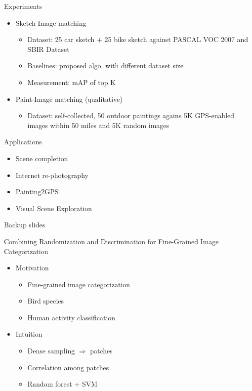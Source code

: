 \documentclass[12pt]{beamer}
\begin{document}
\begin{frame}{Experiments}
	\begin{itemize}
		\item Sketch-Image matching
		\begin{itemize}
			\item Dataset: 25 car sketch + 25 bike sketch against PASCAL VOC 2007 and SBIR Dataset
			\item Baselines: proposed algo. with different dataset size
			\item Measurement: mAP of top K
		\end{itemize}
		\item Paint-Image matching (qualitative)
		\begin{itemize}
			\item Dataset: self-collected, 50 outdoor paintings agains 5K GPS-enabled images within 50 miles and 5K random images
		\end{itemize}
	\end{itemize}
\end{frame}

\begin{frame}{Applications}
	\begin{itemize}
		\item Scene completion
		\item Internet re-photography
		\item Painting2GPS
		\item Visual Scene Exploration
	\end{itemize}
\end{frame}

\begin{frame}{Backup slides}
\end{frame}

\begin{frame}{Combining Randomization and Discrimination for Fine-Grained Image Categorization}
    \begin{itemize}
        \item Motivation
        \begin{itemize}
            \item Fine-grained image categorization
            \item Bird species
            \item Human activity classification
        \end{itemize}
        \item Intuition
        \begin{itemize}
            \item Dense sampling $\Rightarrow$ patches
            \item Correlation among patches
            \item Random forest + SVM
        \end{itemize}
    \end{itemize}
\end{frame}
\end{document}
